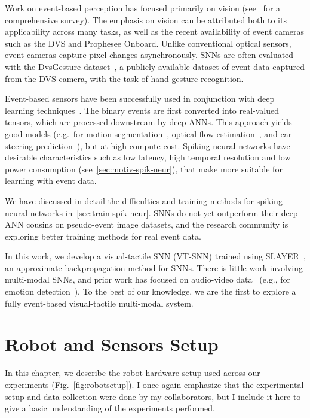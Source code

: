 \documentclass[fyp]{socreport}
\begin{document}
Work on event-based perception has focused primarily on vision
(see~\cite{Gallego2018} for a comprehensive survey). The emphasis on vision can
be attributed both to its applicability across many tasks, as well as the recent
availability of event cameras such as the DVS and Prophesee Onboard. Unlike
conventional optical sensors, event cameras capture pixel changes
asynchronously. SNNs are often evaluated with the DvsGesture
dataset~\cite{dvsgesture}, a publicly-available dataset of event data captured
from the DVS camera, with the task of hand gesture recognition.

Event-based sensors have been successfully used in conjunction with deep
learning techniques~\cite{Gallego2018}. The binary events are first converted
into real-valued tensors, which are processed downstream by deep ANNs. This
approach yields good models (e.g.\ for motion segmentation~\cite{Mitrokhin2019}, optical flow
estimation~\cite{zhu2018ev}, and car steering
prediction~\cite{maqueda2018event}), but at high compute cost. Spiking neural
networks have desirable characteristics such as low latency, high temporal
resolution and low power consumption (see~\autoref{sec:motiv-spik-neur}),
that make more suitable for learning with event data.

We have discussed in detail the difficulties and training methods for spiking
neural networks in~\autoref{sec:train-spik-neur}. SNNs do not yet outperform
their deep ANN cousins on pseudo-event image datasets, and the research
community is exploring better training methods for real event data.

In this work, we develop a visual-tactile SNN (VT-SNN) trained using
SLAYER~\cite{NIPS2018_7415}, an approximate backpropagation method for SNNs.
There is little work involving multi-modal SNNs, and prior work has focused on
audio-video data~\cite{chevallier2005distributed,Rathi2018} (e.g., for emotion
detection~\cite{mansouri2019speech}). To the best of our knowledge, we are the
first to explore a fully event-based visual-tactile multi-modal system.

\chapter{Robot and Sensors Setup\label{cha:exp_setup}}

In this chapter, we describe the robot hardware setup used across our
experiments (Fig.~\ref{fig:robotsetup}). I once again emphasize that the
experimental setup and data collection were done by my collaborators, but I
include it here to give a basic understanding of the experiments performed.
\end{document}
